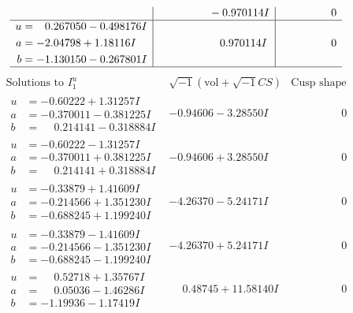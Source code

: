 \documentclass[1p]{elsarticle_modified}
\theoremstyle{definition}
\newcommand{\I}{\sqrt{-1}}
\begin{document}
$$\begin{array}{c|c|c}
 & \phantom{-0.000000 } -0.970114 I & \phantom{-0.000000 } 0 \\ \hline\begin{aligned}
u &= \phantom{-}0.267050 - 0.498176 I \\
a &= -2.04798 + 1.18116 I \\
b &= -1.130150 - 0.267801 I\end{aligned}
 & \phantom{-0.000000 -}0.970114 I & \phantom{-0.000000 } 0\\
 \hline 
 \end{array}$$\newpage$$\begin{array}{c|c|c}  
\text{Solutions to }I^u_{1}& \I (\text{vol} + \sqrt{-1}CS) & \text{Cusp shape}\\
 \hline 
\begin{aligned}
u &= -0.60222 + 1.31257 I \\
a &= -0.370011 - 0.381225 I \\
b &= \phantom{-}0.214141 - 0.318884 I\end{aligned}
 & -0.94606 - 3.28550 I & \phantom{-0.000000 } 0 \\ \hline\begin{aligned}
u &= -0.60222 - 1.31257 I \\
a &= -0.370011 + 0.381225 I \\
b &= \phantom{-}0.214141 + 0.318884 I\end{aligned}
 & -0.94606 + 3.28550 I & \phantom{-0.000000 } 0 \\ \hline\begin{aligned}
u &= -0.33879 + 1.41609 I \\
a &= -0.214566 + 1.351230 I \\
b &= -0.688245 + 1.199240 I\end{aligned}
 & -4.26370 - 5.24171 I & \phantom{-0.000000 } 0 \\ \hline\begin{aligned}
u &= -0.33879 - 1.41609 I \\
a &= -0.214566 - 1.351230 I \\
b &= -0.688245 - 1.199240 I\end{aligned}
 & -4.26370 + 5.24171 I & \phantom{-0.000000 } 0 \\ \hline\begin{aligned}
u &= \phantom{-}0.52718 + 1.35767 I \\
a &= \phantom{-}0.05036 - 1.46286 I \\
b &= -1.19936 - 1.17419 I\end{aligned}
 & \phantom{-}0.48745 + 11.58140 I & \phantom{-0.000000 } 0 \\ \hline\begin{aligned}

\end{aligned}
\end{array}$$
\end{document}
